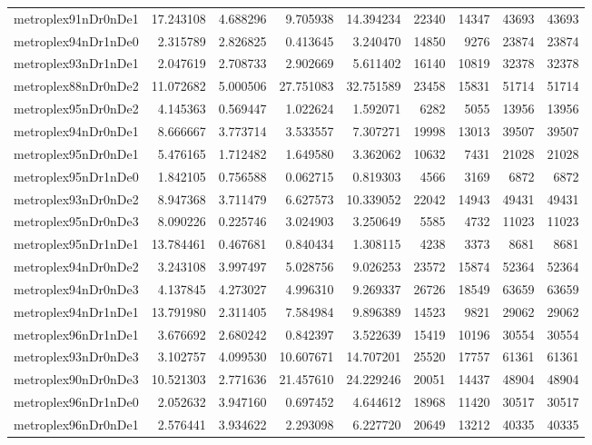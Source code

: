 \begin{longtable}{|l|r|r|r|r|r|r|r|r|}
metroplex91nDr0nDe1 & 17.243108 & 4.688296 & 9.705938 & 14.394234 & 22340 & 14347 & 43693 & 43693 \\
metroplex94nDr1nDe0 & 2.315789 & 2.826825 & 0.413645 & 3.240470 & 14850 & 9276 & 23874 & 23874 \\
metroplex93nDr1nDe1 & 2.047619 & 2.708733 & 2.902669 & 5.611402 & 16140 & 10819 & 32378 & 32378 \\
metroplex88nDr0nDe2 & 11.072682 & 5.000506 & 27.751083 & 32.751589 & 23458 & 15831 & 51714 & 51714 \\
metroplex95nDr0nDe2 & 4.145363 & 0.569447 & 1.022624 & 1.592071 & 6282 & 5055 & 13956 & 13956 \\
metroplex94nDr0nDe1 & 8.666667 & 3.773714 & 3.533557 & 7.307271 & 19998 & 13013 & 39507 & 39507 \\
metroplex95nDr0nDe1 & 5.476165 & 1.712482 & 1.649580 & 3.362062 & 10632 & 7431 & 21028 & 21028 \\
metroplex95nDr1nDe0 & 1.842105 & 0.756588 & 0.062715 & 0.819303 & 4566 & 3169 & 6872 & 6872 \\
metroplex93nDr0nDe2 & 8.947368 & 3.711479 & 6.627573 & 10.339052 & 22042 & 14943 & 49431 & 49431 \\
metroplex95nDr0nDe3 & 8.090226 & 0.225746 & 3.024903 & 3.250649 & 5585 & 4732 & 11023 & 11023 \\
metroplex95nDr1nDe1 & 13.784461 & 0.467681 & 0.840434 & 1.308115 & 4238 & 3373 & 8681 & 8681 \\
metroplex94nDr0nDe2 & 3.243108 & 3.997497 & 5.028756 & 9.026253 & 23572 & 15874 & 52364 & 52364 \\
metroplex94nDr0nDe3 & 4.137845 & 4.273027 & 4.996310 & 9.269337 & 26726 & 18549 & 63659 & 63659 \\
metroplex94nDr1nDe1 & 13.791980 & 2.311405 & 7.584984 & 9.896389 & 14523 & 9821 & 29062 & 29062 \\
metroplex96nDr1nDe1 & 3.676692 & 2.680242 & 0.842397 & 3.522639 & 15419 & 10196 & 30554 & 30554 \\
metroplex93nDr0nDe3 & 3.102757 & 4.099530 & 10.607671 & 14.707201 & 25520 & 17757 & 61361 & 61361 \\
metroplex90nDr0nDe3 & 10.521303 & 2.771636 & 21.457610 & 24.229246 & 20051 & 14437 & 48904 & 48904 \\
metroplex96nDr1nDe0 & 2.052632 & 3.947160 & 0.697452 & 4.644612 & 18968 & 11420 & 30517 & 30517 \\
metroplex96nDr0nDe1 & 2.576441 & 3.934622 & 2.293098 & 6.227720 & 20649 & 13212 & 40335 & 40335 \\

\end{longtable}
